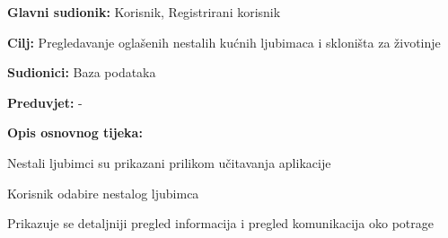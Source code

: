 					\noindent {}
					\begin{packed_item}
	
						\item \textbf{Glavni sudionik: }Korisnik, Registrirani korisnik
						\item  \textbf{Cilj:} Pregledavanje oglašenih nestalih kućnih ljubimaca i skloništa za životinje
						\item  \textbf{Sudionici:} Baza podataka
						\item  \textbf{Preduvjet:} -
						\item  \textbf{Opis osnovnog tijeka:}
						
						\item[] \begin{packed_enum}
	
							\item Nestali ljubimci su prikazani prilikom učitavanja aplikacije
							\item Korisnik odabire nestalog ljubimca
							\item Prikazuje se detaljniji pregled informacija i pregled komunikacija oko potrage
						\end{packed_enum}
						
					\end{packed_item}
				
